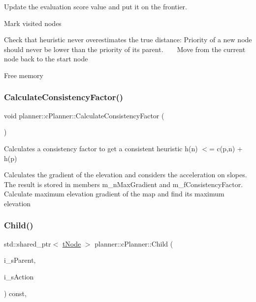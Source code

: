 Update the evaluation score value and put it on the frontier.

Mark visited nodes

Check that heuristic never overestimates the true distance\+: Priority of a new node should never be lower than the priority of its parent. ~\newline
~\newline
 Move from the current node back to the start node

Free memory \mbox{\label{classplanner_1_1c_planner_a2e5a745f83f903662eff914d8beddb5e}} 
\subsubsection{\texorpdfstring{Calculate\+Consistency\+Factor()}{CalculateConsistencyFactor()}}
{\footnotesize\ttfamily void planner\+::c\+Planner\+::\+Calculate\+Consistency\+Factor (\begin{DoxyParamCaption}{ }\end{DoxyParamCaption})\hspace{0.3cm}{\ttfamily [protected]}}



Calculates a consistency factor to get a consistent heuristic h(n) $<$= c(p,n) + h(p) 

Calculates the gradient of the elevation and considers the acceleration on slopes. The result is stored in members m\+\_\+n\+Max\+Gradient and m\+\_\+f\+Consistency\+Factor. Calculate maximum elevation gradient of the map and find its maximum elevation \mbox{\label{classplanner_1_1c_planner_adbffc6ce05119c940a09369d7e61554e}} 
\subsubsection{\texorpdfstring{Child()}{Child()}}
{\footnotesize\ttfamily std\+::shared\+\_\+ptr$<$ \mbox{\hyperlink{structplanner_1_1t_node}{t\+Node}} $>$ planner\+::c\+Planner\+::\+Child (\begin{DoxyParamCaption}\item[{std\+::shared\+\_\+ptr$<$ \mbox{\hyperlink{structplanner_1_1t_node}{t\+Node}} $>$ \&}]{i\+\_\+s\+Parent,  }\item[{const \mbox{\hyperlink{structplanner_1_1t_action}{t\+Action}} \&}]{i\+\_\+s\+Action }\end{DoxyParamCaption}) const\hspace{0.3cm}{\ttfamily [override]}, {\ttfamily [virtual]}}



